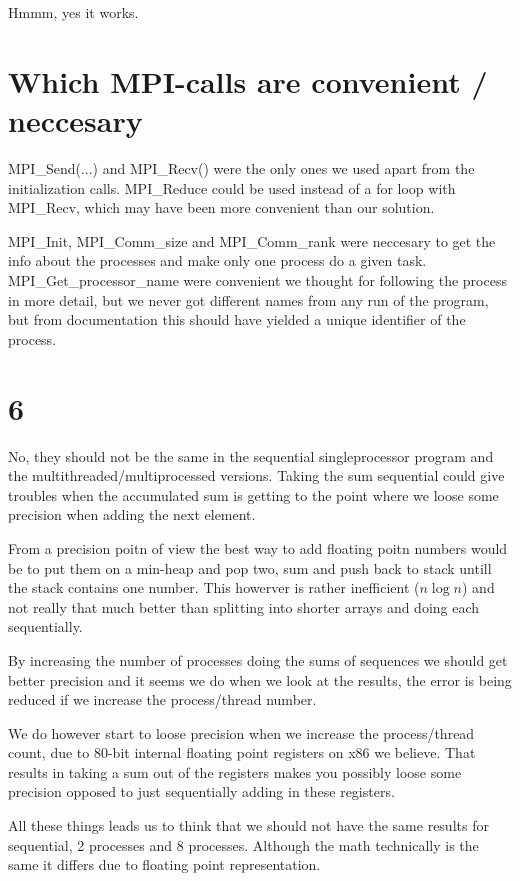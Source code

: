 \section{}
Hmmm, yes it works. 

\section{Which MPI-calls are convenient / neccesary}
MPI_Send(...) and  MPI_Recv() were the only ones we used apart from the initialization calls. 
MPI_Reduce could be used instead of a for loop with MPI_Recv, which may have been more convenient than our solution.  

MPI_Init, MPI_Comm_size and MPI_Comm_rank were neccesary to get the info about the processes and make only one process do a given task. 
MPI_Get_processor_name were convenient we thought for following the process in more detail, but we never got different names from any run of the program, but from documentation this should have yielded a unique identifier of the process. 

\section{6}
No, they should not be the same in the sequential singleprocessor program and the multithreaded/multiprocessed versions. Taking the sum sequential could give troubles when the accumulated sum is getting to the point where we loose some precision when adding the next element. 

From a precision poitn of view the best way to add floating poitn numbers would be to put them on a min-heap and pop two, sum and push back to stack untill the stack contains one number. This howerver is rather inefficient ($n\log n $) and not really that much better than splitting into shorter arrays and doing each sequentially. 

By increasing the number of processes doing the sums of sequences we should get better precision and it seems we do when we look at the results, the error is being reduced if we increase the process/thread number. 

We  do however start to loose precision when we increase the process/thread count, due to 80-bit internal floating point registers on x86 we believe. That results in taking a sum out of the registers makes you possibly loose some precision opposed to just sequentially adding in these registers. 

All these things leads us to think that we should not have the same results for sequential, 2 processes and 8 processes. Although the math technically is the same it differs due to floating point representation. 

